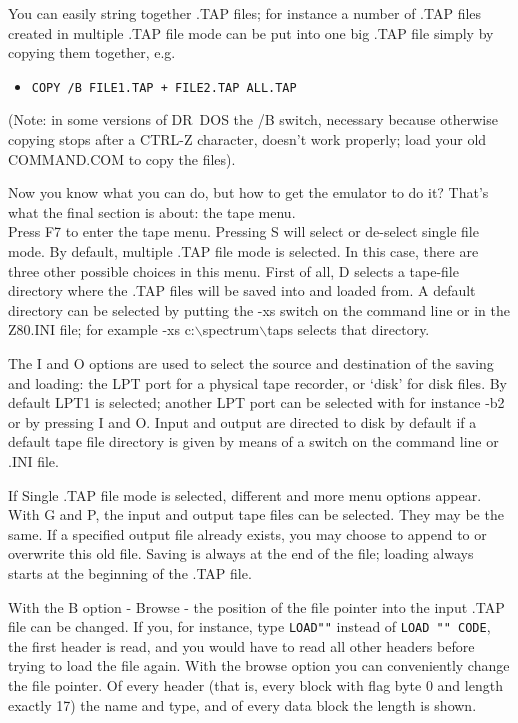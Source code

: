     You can easily string together .TAP files; for instance a number of .TAP
    files created in multiple .TAP file mode can be put into one big .TAP
    file simply by copying them together, e.g.
\begin{itemize}
  \item[] \verb|COPY /B FILE1.TAP + FILE2.TAP ALL.TAP|
\end{itemize}
    (Note: in some versions of DR~DOS the /B switch, necessary because
    otherwise copying stops after a CTRL-Z character, doesn't work properly;
    load your old COMMAND.COM to copy the files).

    Now you know what you can do, but how to get the emulator to do it?
    That's what the final section is about: the tape menu.\\[.3cm]

    Press F7 to enter the tape menu.  Pressing S will select or de-select
    single file mode.  By default, multiple .TAP file mode is selected.  In
    this case, there are three other possible choices in this menu.  First
    of all, D selects a tape-file directory where the .TAP files will be
    saved into and loaded from.  A default directory can be selected by
    putting the -xs switch on the command line or in the Z80.INI file; for
    example -xs c:$\backslash$spectrum$\backslash$taps selects that directory.

    The I and O options are used to select the source and destination of the
    saving and loading: the LPT port for a physical tape recorder, or `disk'
    for disk files.  By default LPT1 is selected; another LPT port can be
    selected with for instance -b2 or by pressing I and O.  Input and output
    are directed to disk by default if a default tape file directory is
    given by means of a switch on the command line or .INI file.

    If Single .TAP file mode is selected, different and more menu options
    appear.  With G and P, the input and output tape files can be selected.
    They may be the same.  If a specified output file already exists, you
    may choose to append to or overwrite this old file.  Saving is always at
    the end of the file; loading always starts at the beginning of the .TAP
    file.

    With the B option - Browse - the position of the file pointer into the
    input .TAP file can be changed.  If you, for instance, type \verb|LOAD""|
    instead of \verb|LOAD "" CODE|, the first header is read, and you would
    have to
    read all other headers before trying to load the file again.  With the
    browse option you can conveniently change the file pointer.  Of every
    header (that is, every block with flag byte 0 and length exactly 17) the
    name and type, and of every data block the length is shown.


